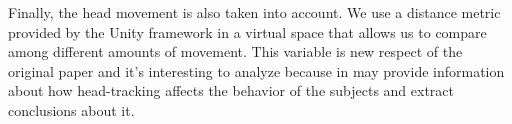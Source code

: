 Finally, the head movement is also taken into account. We use a distance
metric provided by the Unity framework in a virtual space that allows us
to compare among different amounts of movement. This variable is new
respect of the original paper and it's interesting to analyze because in
may provide information about how head-tracking affects the behavior of
the subjects and extract conclusions about it.

